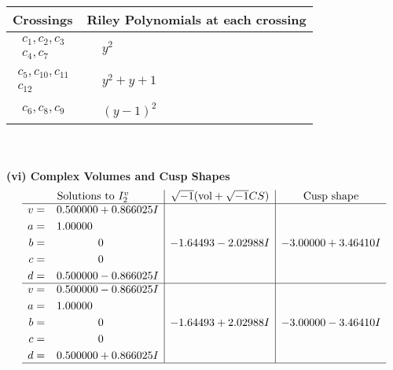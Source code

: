 \documentclass[1p]{elsarticle_modified}
\theoremstyle{definition}
\newcommand{\I}{\sqrt{-1}}
\begin{document}
\begin{tabular}{m{50pt}|m{274pt}}
Crossings & \hspace{64pt}Riley Polynomials at each crossing \\
\hline $$\begin{aligned}c_{1},c_{2},c_{3}\\c_{4},c_{7}\end{aligned}$$&$\begin{aligned}
&y^2
\end{aligned}$\\
\hline $$\begin{aligned}c_{5},c_{10},c_{11}\\c_{12}\end{aligned}$$&$\begin{aligned}
&y^2+y+1
\end{aligned}$\\
\hline $$\begin{aligned}c_{6},c_{8},c_{9}\end{aligned}$$&$\begin{aligned}
&(y-1)^2
\end{aligned}$\\
\hline
\end{tabular}\\~\\
\newpage\flushleft \textbf{(vi) Complex Volumes and Cusp Shapes}
$$\begin{array}{c|c|c}  
\text{Solutions to }I^v_{2}& \I (\text{vol} + \sqrt{-1}CS) & \text{Cusp shape}\\
 \hline 
\begin{aligned}
v &= \phantom{-}0.500000 + 0.866025 I \\
a &= \phantom{-}1.00000\phantom{ +0.000000I} \\
b &= \phantom{-0.000000 } 0 \\
c &= \phantom{-0.000000 } 0 \\
d &= \phantom{-}0.500000 - 0.866025 I\end{aligned}
 & -1.64493 - 2.02988 I & -3.00000 + 3.46410 I \\ \hline\begin{aligned}
v &= \phantom{-}0.500000 - 0.866025 I \\
a &= \phantom{-}1.00000\phantom{ +0.000000I} \\
b &= \phantom{-0.000000 } 0 \\
c &= \phantom{-0.000000 } 0 \\
d &= \phantom{-}0.500000 + 0.866025 I\end{aligned}
 & -1.64493 + 2.02988 I & -3.00000 - 3.46410 I\\
 \hline 
 \end{array}$$\newpage\newpage\renewcommand{\arraystretch}{1}
\end{document}
